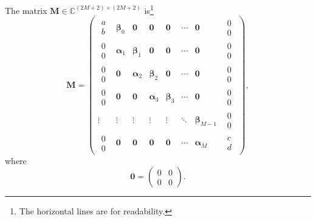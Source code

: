 \documentclass[]{article}
\begin{document}
	The matrix $\mathbf{M}\in\mathbb{C}^{(2M+2)\times(2M+2)}$ is\footnote{The horizontal lines are for readability.}
	\begin{equation}
		\mathbf{M}=
		\begin{pmatrix}
			\begin{matrix}a\\b\end{matrix}&\bm{\beta}_0&\bm{0}&\mathbf{0}&\mathbf{0}&\cdots&\mathbf{0}&\begin{matrix}0\\0\end{matrix}\\
			\hline
			\begin{matrix}0\\0\end{matrix}&\bm{\alpha}_1&\bm{\beta}_1&\mathbf{0}&\mathbf{0}&\cdots&\mathbf{0}&\begin{matrix}0\\0\end{matrix}\\
			\hline 
			\begin{matrix}0\\0\end{matrix}&\mathbf{0}&\bm{\alpha}_2&\bm{\beta}_2&\mathbf{0}&\cdots&\mathbf{0}&\begin{matrix}0\\0\end{matrix}\\
			\hline
			\begin{matrix}0\\0\end{matrix}&\mathbf{0}&\mathbf{0}&\bm{\alpha}_3&\bm{\beta}_3&\cdots&\mathbf{0}&\begin{matrix}0\\0\end{matrix}\\
			\hline
			\vdots&\vdots&\vdots&\vdots&\vdots&\ddots&\bm{\beta}_{M-1}&\begin{matrix}0\\0\end{matrix}\\
			\hline
			\begin{matrix}0\\0\end{matrix}&\mathbf{0}&\mathbf{0}&\mathbf{0}&\mathbf{0}&\cdots&\bm{\alpha}_{M}&\begin{matrix}c\\d\end{matrix}
		\end{pmatrix},
	\end{equation}
	where 
	\begin{equation}
		\mathbf{0}=\begin{pmatrix}0&0\\0&0\end{pmatrix}.
	\end{equation}
\end{document}

